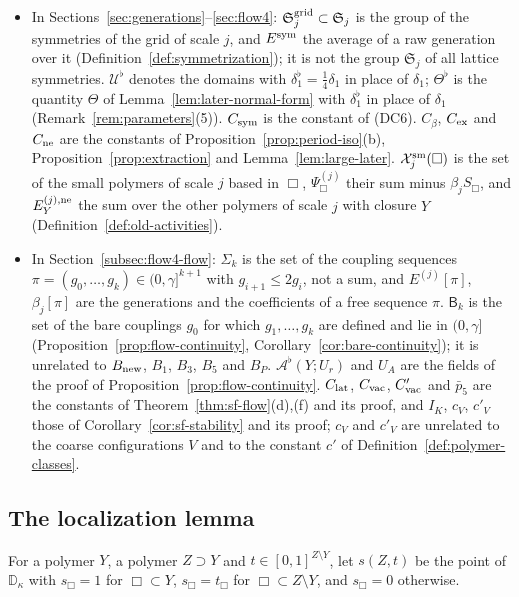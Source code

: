 \begin{remark}
\begin{itemize}
\item In Sections~\ref{sec:generations}--\ref{sec:flow4}: $\mathfrak S^{\rm grid}_j\subset\mathfrak S_j$ is the group of the symmetries of the grid of scale $j$, and $E^{\rm sym}$ the average of a raw generation over it (Definition~\ref{def:symmetrization}); it is not the group $\mathfrak S_j$ of all lattice symmetries. $\mathcal U^\flat$ denotes the domains with $\delta_1^\flat=\frac14\delta_1$ in place of $\delta_1$; $\Theta^\flat$ is the quantity $\Theta$ of Lemma~\ref{lem:later-normal-form} with $\delta_1^\flat$ in place of $\delta_1$ (Remark~\ref{rem:parameters}(5)). $C_{\rm sym}$ is the constant of (DC6). $C_\beta$, $C_{\rm ex}$ and $C_{\rm ne}$ are the constants of Proposition~\ref{prop:period-iso}(b), Proposition~\ref{prop:extraction} and Lemma~\ref{lem:large-later}. $\mathcal X^{\rm sm}_j(\Box)$ is the set of the small polymers of scale $j$ based in $\Box$, $\Psi^{(j)}_\Box$ their sum minus $\beta_jS_\Box$, and $E^{(j),\rm ne}_Y$ the sum over the other polymers of scale $j$ with closure $Y$ (Definition~\ref{def:old-activities}).
\item In Section~\ref{subsec:flow4-flow}: $\Sigma_k$ is the set of the coupling sequences $\pi=(g_0,\dots,g_k)\in(0,\gamma]^{k+1}$ with $g_{i+1}\le2g_i$, not a sum, and $E^{(j)}[\pi]$, $\beta_j[\pi]$ are the generations and the coefficients of a free sequence $\pi$. $\mathsf B_k$ is the set of the bare couplings $g_0$ for which $g_1,\dots,g_k$ are defined and lie in $(0,\gamma]$ (Proposition~\ref{prop:flow-continuity}, Corollary~\ref{cor:bare-continuity}); it is unrelated to $B_{\rm new}$, $B_1$, $B_3$, $B_5$ and $B_P$. $\mathcal A^\flat(Y;U_r)$ and $U_A$ are the fields of the proof of Proposition~\ref{prop:flow-continuity}. $C_{\rm lat}$, $C_{\rm vac}$, $C'_{\rm vac}$ and $\bar p_5$ are the constants of Theorem~\ref{thm:sf-flow}(d),(f) and its proof, and $I_K$, $c_V$, $c'_V$ those of Corollary~\ref{cor:sf-stability} and its proof; $c_V$ and $c'_V$ are unrelated to the coarse configurations $V$ and to the constant $c'$ of Definition~\ref{def:polymer-classes}.
\end{itemize}
\end{remark}

\subsection{The localization lemma}\label{subsec:sq-loc}

For a polymer $Y$, a polymer $Z\supset Y$ and $t\in[0,1]^{Z\setminus Y}$, let $s(Z,t)$ be the point of $\mathbb D_\kappa$ with $s_\Box=1$ for $\Box\subset Y$, $s_\Box=t_\Box$ for $\Box\subset Z\setminus Y$, and $s_\Box=0$ otherwise.

